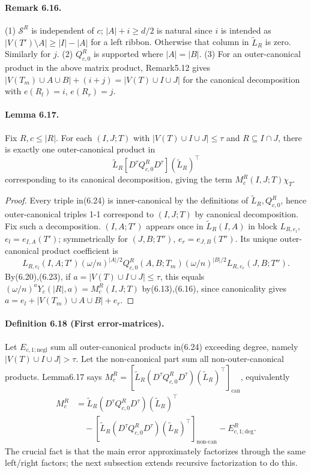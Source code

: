 \documentclass[10pt,a4paper]{article}
\begin{document}
\paragraph{Remark 6.16.} (1) $\mathcal S^R$ is independent of $c$; $|A|+i\ge d/2$ is natural since $i$ is intended as $|V(T')\setminus A|\ge|I|-|A|$ for a left ribbon. Otherwise that column in $\widetilde L_R$ is zero. Similarly for $j$. (2) $Q_{c,0}^R$ is supported where $|A|=|B|$. (3) For an outer-canonical product in the above matrix product, Remark5.12 gives $|V(T_m)\cup A\cup B|+(i+j)=|V(T)\cup I\cup J|$ for the canonical decomposition with $e(R_l)=i$, $e(R_r)=j$.
\paragraph{Lemma 6.17.} Fix $R,c\le|R|$. For each $(I,J;T)$ with $|V(T)\cup I\cup J|\le\tau$ and $R\subseteq I\cap J$, there is exactly one outer-canonical product in
\[\widetilde L_R[D^\tau Q_{c,0}^R D^\tau](\widetilde L_R)^\top\tag{6.24}\]
corresponding to its canonical decomposition, giving the term $M_c^R(I,J;T)\chi_T$.
\begin{proof}Every triple in(6.24) is inner-canonical by the definitions of $\widetilde L_R,Q_{c,0}^R$, hence outer-canonical triples 1-1 correspond to $(I,J;T)$ by canonical decomposition. Fix such a decomposition. $(I,A;T')$ appears once in $\widetilde L_R(I,A)$ in block $L_{R,e_l}$, $e_l=e_{I,A}(T')$; symmetrically for $(J,B;T'')$, $e_r=e_{J,B}(T'')$. Its unique outer-canonical product coefficient is
\[L_{R,e_l}(I,A;T')(\omega/n)^{|A|/2}Q_{c,0}^R(A,B;T_m)(\omega/n)^{|B|/2}L_{R,e_r}(J,B;T'').\tag{6.25}\]
By(6.20),(6.23), if $a=|V(T)\cup I\cup J|\le\tau$, this equals $(\omega/n)^aY_c(|R|,a)=M_c^R(I,J;T)$ by(6.13),(6.16), since canonicality gives $a=e_l+|V(T_m)\cup A\cup B|+e_r$.\end{proof}
\paragraph{Definition 6.18 (First error-matrices).} Let $E_{c,1;\mathrm{negl}}$ sum all outer-canonical products in(6.24) exceeding degree, namely $|V(T)\cup I\cup J|>\tau$. Let the non-canonical part sum all non-outer-canonical products. Lemma6.17 says $M_c^R=[\widetilde L_R(D^\tau Q_{c,0}^R D^\tau)(\widetilde L_R)^\top]_{\mathrm{can}}$, equivalently
\begin{align*}M_c^R&=\widetilde L_R(D^\tau Q_{c,0}^R D^\tau)(\widetilde L_R)^\top\\&\quad-[\widetilde L_R(D^\tau Q_{c,0}^R D^\tau)(\widetilde L_R)^\top]_{\mathrm{non\text{-}can}}-E^R_{c,1;\mathrm{deg}}.\tag{6.26}\end{align*}
The crucial fact is that the main error approximately factorizes through the same left/right factors; the next subsection extends recursive factorization to do this.
\end{document}
